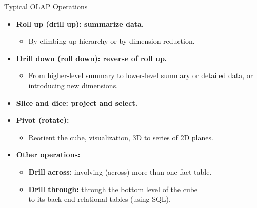 \begin{frame}{Typical OLAP Operations}
  \begin{itemize}
  \item \textbf{{\color{airforceblue}Roll up} (drill up): summarize data.}
    \begin{itemize}
    \item By climbing up hierarchy or by dimension reduction.
    \end{itemize}
  \item \textbf{{\color{airforceblue}Drill down} (roll down): reverse of roll up.}
    \begin{itemize}
    \item From higher-level summary to lower-level summary or detailed data, or introducing new dimensions.
    \end{itemize}
  \item \textbf{{\color{airforceblue}Slice and dice}: project and select.}
  \item \textbf{{\color{airforceblue}Pivot} (rotate):}
    \begin{itemize}
    \item Reorient the cube, visualization, 3D to series of 2D planes.
    \end{itemize}
  \item \textbf{Other operations:}
    \begin{itemize}
    \item \textbf{{\color{airforceblue}Drill across}:} involving (across) more than one fact table.
    \item \textbf{{\color{airforceblue}Drill through}:} through the bottom level of the cube \\ to its back-end relational tables (using SQL).
    \end{itemize}
  \end{itemize}
\end{frame}

